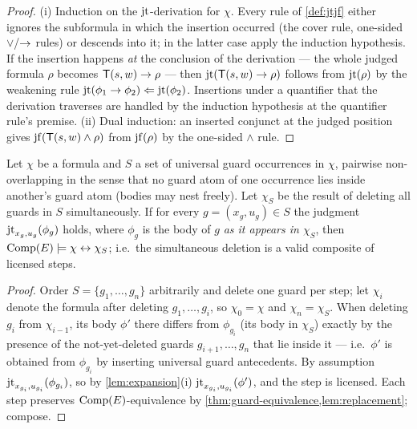 \begin{proof}
  (i) Induction on the $\mathrm{jt}$-derivation for $\chi$.  Every rule of
  \cref{def:jtjf} either ignores the subformula in which the insertion
  occurred (the cover rule, one-sided $\vee$/$\rightarrow$ rules) or descends
  into it; in the latter case apply the induction hypothesis.  If the
  insertion happens \emph{at} the conclusion of the derivation --- the
  whole judged formula $\rho$ becomes $\mathsf{T}(s,w) \rightarrow \rho$ --- then
  $\mathrm{jt}(\mathsf{T}(s,w) \rightarrow \rho)$ follows from $\mathrm{jt}(\rho)$ by the
  weakening rule $\mathrm{jt}(\phi_1 \rightarrow \phi_2) \Leftarrow \mathrm{jt}(\phi_2)$.
  Insertions under a quantifier that the derivation traverses are handled
  by the induction hypothesis at the quantifier rule's premise.
  (ii) Dual induction: an inserted conjunct at the judged position gives
  $\mathrm{jf}(\mathsf{T}(s,w) \wedge \rho)$ from $\mathrm{jf}(\rho)$ by the one-sided
  $\wedge$ rule.
\end{proof}

\begin{proposition}
  \label{prop:simultaneous}
  Let $\chi$ be a formula and $S$ a set of universal guard occurrences in
  $\chi$, pairwise non-overlapping in the sense that no guard atom of one
  occurrence lies inside another's guard atom (bodies may nest freely).
  Let $\chi_S$ be the result of deleting all guards in $S$
  simultaneously.  If for every $g = (x_g, u_g) \in S$ the judgment
  $\mathrm{jt}_{x_g,u_g}(\phi_g)$ holds, where $\phi_g$ is the body of $g$
  \emph{as it appears in $\chi_S$}, then
  $\mathrm{Comp}(E) \models \chi \leftrightarrow \chi_S$; i.e.\ the simultaneous deletion is
  a valid composite of licensed steps.
\end{proposition}

\begin{proof}
  Order $S = \{g_1, \dots, g_n\}$ arbitrarily and delete one guard per
  step; let $\chi_i$ denote the formula after deleting
  $g_1,\dots,g_i$, so $\chi_0 = \chi$ and $\chi_n = \chi_S$.  When
  deleting $g_{i}$ from $\chi_{i-1}$, its body $\phi'$ there differs from
  $\phi_{g_i}$ (its body in $\chi_S$) exactly by the presence of the
  not-yet-deleted guards $g_{i+1},\dots,g_n$ that lie inside it --- i.e.\
  $\phi'$ is obtained from $\phi_{g_i}$ by inserting universal guard
  antecedents.  By assumption $\mathrm{jt}_{x_{g_i},u_{g_i}}(\phi_{g_i})$, so by
  \cref{lem:expansion}(i) $\mathrm{jt}_{x_{g_i},u_{g_i}}(\phi')$, and the step is
  licensed.  Each step preserves $\mathrm{Comp}(E)$-equivalence by
  \cref{thm:guard-equivalence,lem:replacement}; compose.
\end{proof}

